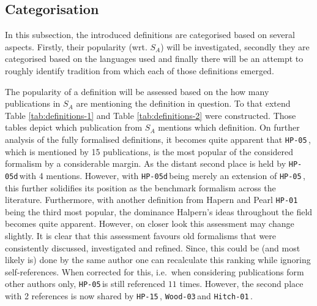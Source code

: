 \documentclass[11pt,a4paper]{book}
\theoremstyle{definition}
\theoremstyle{definition}
\theoremstyle{definition}
\theoremstyle{remark}
\newcommand{\prset}{S_{A}}
\newcommand{\hitch}{\texttt{Hitch-01}\,}
\newcommand{\hpo}{\texttt{HP-01}\,}
\newcommand{\wood}{\texttt{Wood-03}\,}
\newcommand{\hpu}{\texttt{HP-05}\,}
\newcommand{\hpud}{\texttt{HP-05d}\,}
\newcommand{\hpm}{\texttt{HP-15}\,}
\begin{document}
\subsection{Categorisation}
In this subsection, the introduced definitions are categorised based on several aspects. Firstly, their popularity (wrt. $\prset$) will be investigated, secondly they are categorised based on the languages used and finally there will be an attempt to roughly identify tradition from which each of those definitions emerged. 

The popularity of a definition will be assessed based on the how many publications in $\prset$ are mentioning the definition in question.
To that extend Table \ref{tab:definitions-1} and Table \ref{tab:definitions-2} were constructed. Those tables depict which publication from $\prset$ mentions which definition.
On further analysis of the fully formalised definitions, it becomes quite apparent that \hpu, which is mentioned by 15 publications, is the most popular of the considered formalism by a considerable margin. As the distant second place is held by \hpud with 4 mentions. However, with \hpud being merely an extension of \hpu, this further solidifies its position as the benchmark formalism across the literature.
Furthermore, with another definition from Hapern and Pearl \hpo being the third most popular, the dominance Halpern's ideas throughout the field becomes quite apparent.
However, on closer look this assessment may change slightly. It is clear that this assessment favours old formalisms that were consistently discussed, investigated and refined.
Since, this could be (and most likely is) done by the same author one can recalculate this ranking while ignoring self-references. When corrected for this, i.e.\ when considering publications form other authors only, \hpu is still referenced $11$ times. However, the second place with 2 references is now shared by \hpm, \wood and \hitch. 
\end{document}
